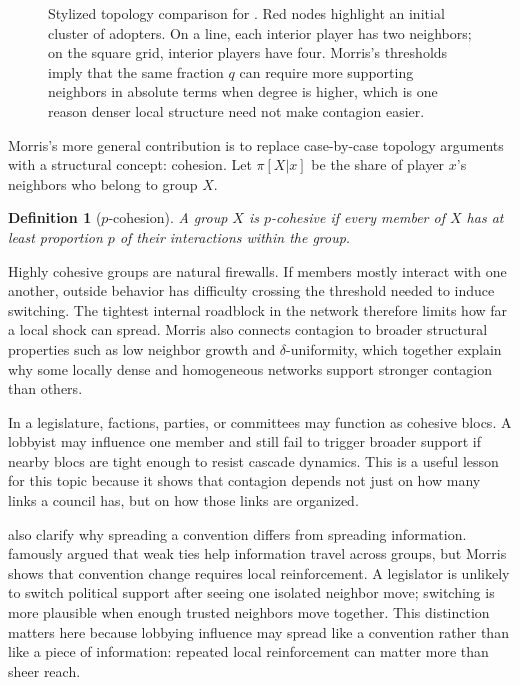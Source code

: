 \documentclass[11pt,letterpaper]{article}
\newtheorem{definition}{Definition}
\begin{document}
\begin{figure}[t]
{\begin{minipage}{0.47\textwidth}
\end{minipage}
}
\caption{Stylized topology comparison for \citet{morris2000}. Red nodes highlight an initial cluster of adopters. On a line, each interior player has two neighbors; on the square grid, interior players have four. Morris's thresholds imply that the same fraction $q$ can require more supporting neighbors in absolute terms when degree is higher, which is one reason denser local structure need not make contagion easier.}
\label{fig:morris-topologies}
\end{figure}

Morris's more general contribution is to replace case-by-case topology arguments with a structural concept: cohesion. Let $\pi[X|x]$ be the share of player $x$'s neighbors who belong to group $X$.

\begin{definition}[$p$-cohesion]
A group $X$ is \textit{$p$-cohesive} if every member of $X$ has at least proportion $p$ of their interactions within the group.
\end{definition}

Highly cohesive groups are natural firewalls. If members mostly interact with one another, outside behavior has difficulty crossing the threshold needed to induce switching. The tightest internal roadblock in the network therefore limits how far a local shock can spread. Morris also connects contagion to broader structural properties such as low neighbor growth and $\delta$-uniformity, which together explain why some locally dense and homogeneous networks support stronger contagion than others.

In a legislature, factions, parties, or committees may function as cohesive blocs. A lobbyist may influence one member and still fail to trigger broader support if nearby blocs are tight enough to resist cascade dynamics. This is a useful lesson for this topic because it shows that contagion depends not just on how many links a council has, but on how those links are organized.

\citet{morris2000} also clarify why spreading a convention differs from spreading information. \citet{granovetter1973} famously argued that weak ties help information travel across groups, but Morris shows that convention change requires local reinforcement. A legislator is unlikely to switch political support after seeing one isolated neighbor move; switching is more plausible when enough trusted neighbors move together. This distinction matters here because lobbying influence may spread like a convention rather than like a piece of information: repeated local reinforcement can matter more than sheer reach.
\end{document}
